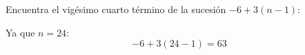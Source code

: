 Encuentra el vigésimo cuarto término de la sucesión $-6+3(n-1)$:

\begin{solutionbox}{1.6cm}
    Ya que $n=24$:
    \[-6+3(24-1)=63\]
\end{solutionbox}
